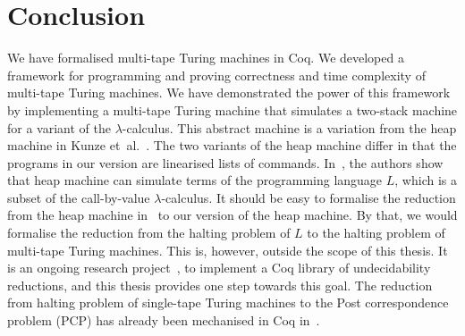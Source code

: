 \chapter{Conclusion}
\label{chap:conclusion}

We have formalised multi-tape Turing machines in Coq.  We developed a framework for programming and proving correctness and time complexity of
multi-tape Turing machines.  We have demonstrated the power of this framework by implementing a multi-tape Turing machine that simulates a two-stack
machine for a variant of the $\lambda$-calculus.  This abstract machine is a variation from the heap machine in Kunze
et~al.~\cite{KunzeEtAl:2018:Formal}.  The two variants of the heap machine differ in that the programs in our version are linearised lists of
commands.  In~\cite{KunzeEtAl:2018:Formal}, the authors show that heap machine can simulate terms of the programming language $L$, which is a subset
of the call-by-value $\lambda$-calculus.  It should be easy to formalise the reduction from the heap machine in~\cite{KunzeEtAl:2018:Formal} to our
version of the heap machine.  By that, we would formalise the reduction from the halting problem of $L$ to the halting problem of multi-tape Turing
machines.  This is, however, outside the scope of this thesis.  It is an ongoing research project~\cite{ForsterLOLA2018}, to implement a Coq library
of undecidability reductions, and this thesis provides one step towards this goal.  The reduction from halting problem of single-tape Turing machines
to the Post correspondence problem (PCP) has already been mechanised in Coq in~\cite{PCPITP}.

